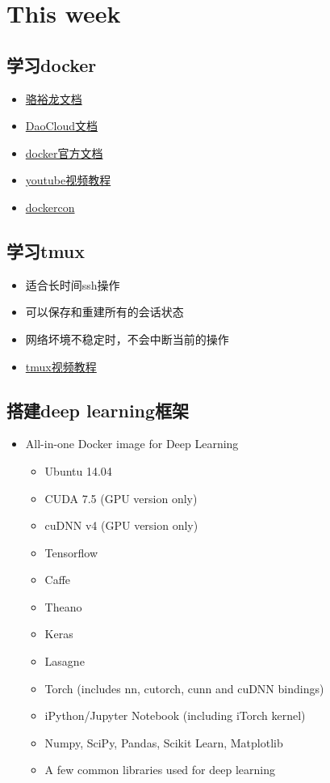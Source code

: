 \documentclass[11pt]{article}
\author{章立}
\date{\today}
\title{}
\begin{document}
\tableofcontents

\section{This week}
\label{sec:orgheadline7}
\subsection{学习docker}
\label{sec:orgheadline1}
\begin{itemize}
\item \href{http://192.168.199.107:10080/w/docker_usage_and_study/}{骆裕龙文档}
\item \href{http://docs.daocloud.io/faq/docker101}{DaoCloud文档}
\item \href{https://docs.docker.com/}{docker官方文档}
\item \href{https://www.youtube.com/playlist?list=PLkA60AVN3hh_6cAz8TUGtkYbJSL2bdZ4h}{youtube视频教程}
\item \href{https://www.youtube.com/user/dockerrun}{dockercon}
\end{itemize}
\subsection{学习tmux}
\label{sec:orgheadline2}
\begin{itemize}
\item 适合长时间ssh操作
\item 可以保存和重建所有的会话状态
\item 网络坏境不稳定时，不会中断当前的操作
\item \href{https://www.youtube.com/playlist?list=PLtK75qxsQaMJ_DmXk9yZbCBJuG9HRwlGc}{tmux视频教程}
\end{itemize}
\subsection{搭建deep learning框架}
\label{sec:orgheadline3}
\begin{itemize}
\item All-in-one Docker image for Deep Learning
\begin{itemize}
\item Ubuntu 14.04
\item CUDA 7.5 (GPU version only)
\item cuDNN v4 (GPU version only)
\item Tensorflow
\item Caffe
\item Theano
\item Keras
\item Lasagne
\item Torch (includes nn, cutorch, cunn and cuDNN bindings)
\item iPython/Jupyter Notebook (including iTorch kernel)
\item Numpy, SciPy, Pandas, Scikit Learn, Matplotlib
\item A few common libraries used for deep learning
\end{itemize}
\end{itemize}
\end{document}
